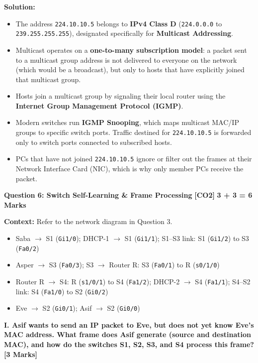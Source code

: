 \documentclass[11pt,a4paper]{article}
\newcommand{\questionheader}[3]{
    \vspace{0.35cm}
    \noindent\colorbox{qboxbg}{
        \parbox{\dimexpr\textwidth-2\fboxsep\relax}{
            \textbf{\textcolor{primary}{\large #1}} \hfill \textbf{\textcolor{accent}{[#2]}} \hfill \textbf{\textcolor{secondary}{#3 Marks}}
        }
    }
    \vspace{0.15cm}
}
\begin{document}
\textbf{Solution:}
\begin{itemize}
    \item The address \texttt{224.10.10.5} belongs to \textbf{IPv4 Class D} (\texttt{224.0.0.0} to \texttt{239.255.255.255}), designated specifically for \textbf{Multicast Addressing}.
    \item Multicast operates on a \textbf{one-to-many subscription model}: a packet sent to a multicast group address is not delivered to everyone on the network (which would be a broadcast), but only to hosts that have explicitly joined that multicast group.
    \item Hosts join a multicast group by signaling their local router using the \textbf{Internet Group Management Protocol (IGMP)}.
    \item Modern switches run \textbf{IGMP Snooping}, which maps multicast MAC/IP groups to specific switch ports. Traffic destined for \texttt{224.10.10.5} is forwarded only to switch ports connected to subscribed hosts.
    \item PCs that have not joined \texttt{224.10.10.5} ignore or filter out the frames at their Network Interface Card (NIC), which is why only member PCs receive the packet.
\end{itemize}

\questionheader{Question 6: Switch Self-Learning \& Frame Processing}{CO2}{3 + 3 = 6}

\textbf{Context:} Refer to the network diagram in Question 3.
\begin{itemize}
    \item Saba $\to$ S1 (\texttt{Gi1/0}); DHCP-1 $\to$ S1 (\texttt{Gi1/1}); S1--S3 link: S1 (\texttt{Gi1/2}) to S3 (\texttt{Fa0/2})
    \item Asper $\to$ S3 (\texttt{Fa0/3}); S3 $\to$ Router R: S3 (\texttt{Fa0/1}) to R (\texttt{s0/1/0})
    \item Router R $\to$ S4: R (\texttt{s1/0/1}) to S4 (\texttt{Fa1/2}); DHCP-2 $\to$ S4 (\texttt{Fa1/1}); S4--S2 link: S4 (\texttt{Fa1/0}) to S2 (\texttt{Gi0/2})
    \item Eve $\to$ S2 (\texttt{Gi0/1}); Asif $\to$ S2 (\texttt{Gi0/0})
\end{itemize}

\textbf{I. Asif wants to send an IP packet to Eve, but does not yet know Eve’s MAC address. What frame does Asif generate (source and destination MAC), and how do the switches S1, S2, S3, and S4 process this frame? [3 Marks]}
\end{document}

